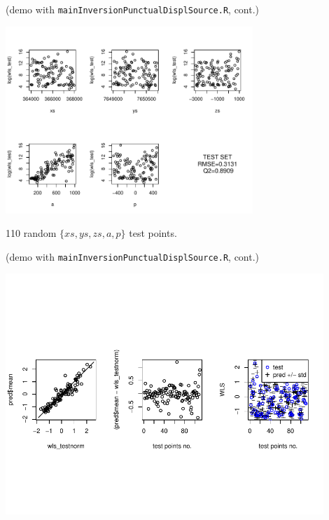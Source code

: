 \begin{frame}{}
\small (demo with \texttt{mainInversionPunctualDisplSource.R}, cont.)
\begin{center}
\includegraphics[width=0.7\textwidth]{4_optimization/figures/misfit_test_set} 
\end{center}
{\tiny 110 random $\{xs,ys,zs,a,p\}$ test points.}\\
\end{frame}

\begin{frame}{}
\small (demo with \texttt{mainInversionPunctualDisplSource.R}, cont.)
\begin{center}
\includegraphics[width=0.9\textwidth]{4_optimization/figures/misfit_test_set_2} 
\end{center}
\end{frame}

